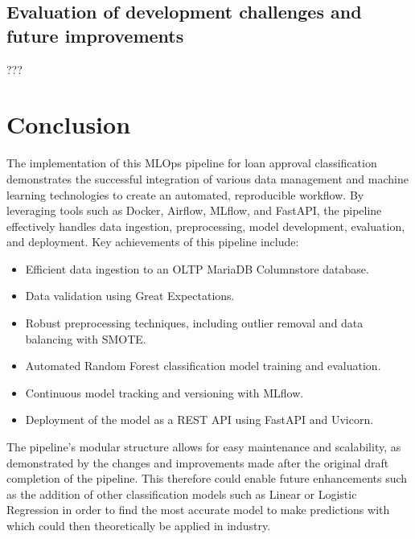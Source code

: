 \documentclass[12pt]{report}
\begin{document}
\section{Evaluation of development challenges and future improvements}
???

\chapter*{Conclusion}
The implementation of this MLOps pipeline for loan approval classification demonstrates the successful integration of various
data management and machine learning technologies to create an automated, reproducible workflow. By leveraging tools such as Docker,
Airflow, MLflow, and FastAPI, the pipeline effectively handles data ingestion, preprocessing, model development, evaluation, and 
deployment. Key achievements of this pipeline include:

\begin{itemize}
    \item Efficient data ingestion to an OLTP MariaDB Columnstore database.
    \item Data validation using Great Expectations.
    \item Robust preprocessing techniques, including outlier removal and data balancing with SMOTE.
    \item Automated Random Forest classification model training and evaluation.
    \item Continuous model tracking and versioning with MLflow.
    \item Deployment of the model as a REST API using FastAPI and Uvicorn.
\end{itemize}

\noindent The pipeline's modular structure allows for easy maintenance and scalability, as demonstrated by the changes and improvements 
made after the original draft completion of the pipeline. This therefore could enable future enhancements such as the addition 
of other classification models such as Linear or Logistic Regression in order to find the most accurate model to make predictions with 
which could then theoretically be applied in industry.
   
\end{document}
